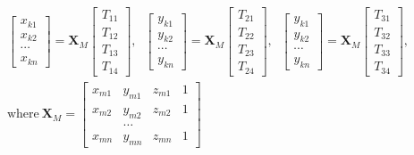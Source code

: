 \begin{gather*}
    \begin{bmatrix}
        x_{k1} \\
        x_{k2} \\
        \cdots \\
        x_{kn}
    \end{bmatrix}
    =
    \mathbf{X}_M
    \begin{bmatrix}
        T_{11} \\
        T_{12} \\
        T_{13} \\
        T_{14}
    \end{bmatrix}
    ,\;\;
    \begin{bmatrix}
        y_{k1} \\
        y_{k2} \\
        \cdots \\
        y_{kn}
    \end{bmatrix}
    =
    \mathbf{X}_M
    \begin{bmatrix}
        T_{21} \\
        T_{22} \\
        T_{23} \\
        T_{24}
    \end{bmatrix}
    ,\;\;
    \begin{bmatrix}
        y_{k1} \\
        y_{k2} \\
        \cdots \\
        y_{kn}
    \end{bmatrix}
    =
    \mathbf{X}_M
    \begin{bmatrix}
        T_{31} \\
        T_{32} \\
        T_{33} \\
        T_{34}
    \end{bmatrix}
    ,\\
    \text{where}~\mathbf{X}_M =
    \begin{bmatrix}
        x_{m1} & y_{m1} & z_{m1} & 1 \\
        x_{m2} & y_{m2} & z_{m2} & 1 \\
        &\dots & & \\
        x_{mn} & y_{mn} & z_{mn} & 1
    \end{bmatrix}
\end{gather*}

